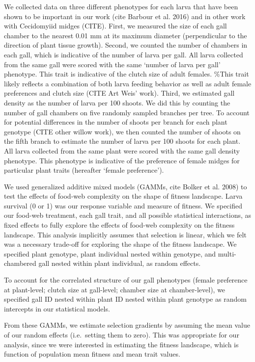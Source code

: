 \documentclass[]{elsarticle} %
\begin{document}
We collected data on three different phenotypes for each larva that have
been shown to be important in our work (cite Barbour et al. 2016) and in
other work with Cecidomyiid midges (CITE). First, we measured the size
of each gall chamber to the nearest 0.01 mm at its maximum diameter
(perpendicular to the direction of plant tissue growth). Second, we
counted the number of chambers in each gall, which is indicative of the
number of larva per gall. All larva collected from the same gall were
scored with the same `number of larva per gall' phenotype. This trait is
indicative of the clutch size of adult females. \%This trait likely
reflects a combination of both larva feeding behavior as well as adult
female preferences and clutch size (CITE Art Weis' work). Third, we
estimated gall density as the number of larva per 100 shoots. We did
this by counting the number of gall chambers on five randomly sampled
branches per tree. To account for potential differences in the number of
shoots per branch for each plant genotype (CITE other willow work), we
then counted the number of shoots on the fifth branch to estimate the
number of larva per 100 shoots for each plant. All larva collected from
the same plant were scored with the same gall density phenotype. This
phenotype is indicative of the preference of female midges for
particular plant traits (hereafter `female preference').

We used generalized additive mixed models (GAMMs, cite Bolker et al.
2008) to test the effects of food-web complexity on the shape of fitness
landscape. Larva survival (0 or 1) was our response variable and measure
of fitness. We specified our food-web treatment, each gall trait, and
all possible statistical interactions, as fixed effects to fully explore
the effects of food-web complexity on the fitness landscape. This
analysis implicitly assumes that selection is linear, which we felt was
a necessary trade-off for exploring the shape of the fitness landscape.
We specified plant genotype, plant individual nested within genotype,
and multi-chambered gall nested within plant individual, as random
effects.

To account for the correlated structure of our gall phenotypes (female
preference at plant-level; clutch size at gall-level; chamber size at
chamber-level), we specified gall ID nested within plant ID nested
within plant genotype as random intercepts in our statistical models.

From these GAMMs, we estimate selection gradients by assuming the mean
value of our random effects (i.e.~setting them to zero). This was
appropriate for our analysis, since we were interested in estimating the
fitness landscape, which is function of population mean fitness and mean
trait values.
\end{document}

